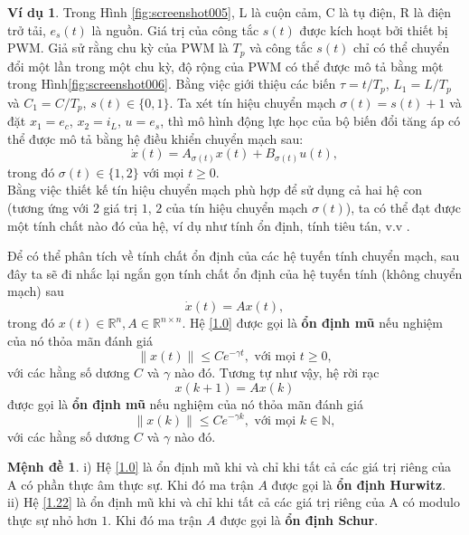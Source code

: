 \documentclass[12pt,a4paper]{report}
\theoremstyle{definition}
\newtheorem{md}{Mệnh đề}
\newtheorem{vd}{Ví dụ}
\theoremstyle{definition}
\numberwithin{dl}{chapter}
\numberwithin{vd}{chapter}
\numberwithin{corollary}{chapter}
\numberwithin{lemma}{chapter}
\numberwithin{md}{chapter}
\numberwithin{dn}{chapter}
\numberwithin{cy}{chapter}
\numberwithin{nx}{chapter}
\newcommand{\si}{\sigma }
\begin{document}
\begin{vd}
\noindent Trong Hình \ref{fig:screenshot005}, L là cuộn cảm, C là tụ điện, R là điện trở tải, $e_s(t)$ là nguồn. Giá trị của công tắc $s(t)$ được kích hoạt bởi thiết bị PWM. Giả sử rằng chu kỳ của PWM là $T_p$ và công tắc $s(t)$ chỉ có thể chuyển đổi một lần trong một chu kỳ, độ rộng của PWM có thể được mô tả bằng một trong Hình\ref{fig:screenshot006}. 
Bằng việc giới thiệu các biến $\tau = t / T_p$, $L_1 = L / T_p$ và $C_1 = C / T_p$, $s(t) \in \{0,1\}$. Ta xét tín hiệu chuyển mạch $\si(t) = s(t)+1$ và đặt 
$x_1 = e_c$, $x_2 = i_L$, $u = e_s$, thì mô hình động lực học của bộ biến đổi tăng áp có thể được mô tả bằng hệ điều khiển chuyển mạch sau:
%
\begin{equation}
\dot{x}(t) = A_{\si(t)} x(t) + B_{\si(t)} u(t),     
\end{equation}
%
trong đó $\si(t) \in \{1,2\}$ với mọi $t\geq 0$.\\
%
Bằng việc thiết kế tín hiệu chuyển mạch phù hợp để sử dụng cả hai hệ con (tương ứng với 2 giá trị $1$, $2$ của tín hiệu chuyển mạch $\si(t)$), ta có thể đạt được một tính chất nào đó của hệ, ví dụ như tính ổn định, tính tiêu tán, v.v .
\end{vd}

Để có thể phân tích về tính chất ổn định của các hệ tuyến tính chuyển mạch, sau đây ta sẽ đi nhắc lại ngắn gọn tính chất ổn định của hệ tuyến tính (không chuyển mạch) sau
%
\begin{equation}\label{1.0}
\dot{x}(t)=A x(t), 
\end{equation}
%
trong đó $x(t) \in \mathbb{R}^{n}, A \in \mathbb{R}^{n \times n}$. Hệ \eqref{1.0} được gọi là \textbf{ổn định mũ} nếu nghiệm của nó thỏa mãn đánh giá
%
\[
\|x(t)\| \leq Ce^{-\gamma t}, \mbox { với mọi } t\geq 0,
\]
%
với các hằng số dương $C$ và $\gamma$ nào đó. Tương tự như vậy, hệ rời rạc
%
\begin{equation}\label{1.22}
x(k+1) = A x(k)
\end{equation}
%
được gọi là \textbf{ổn định mũ} nếu nghiệm của nó thỏa mãn đánh giá
%
\[
\|x(k)\| \leq Ce^{-\gamma k}, \mbox { với mọi } k \in \mathbb{N},
\]
%
với các hằng số dương $C$ và $\gamma$ nào đó.

\begin{md}
i) Hệ \eqref{1.0} là ổn định mũ khi và chỉ khi tất cả các giá trị riêng của A có phần thực âm thực sự. Khi đó ma trận $A$ được gọi là \textbf{ổn định Hurwitz}. \\
ii) Hệ \eqref{1.22} là ổn định mũ khi và chỉ khi tất cả các giá trị riêng của A có modulo thực sự nhỏ hơn $1$. Khi đó ma trận $A$ được gọi là \textbf{ổn định Schur}.
\end{md} 
\end{document}
